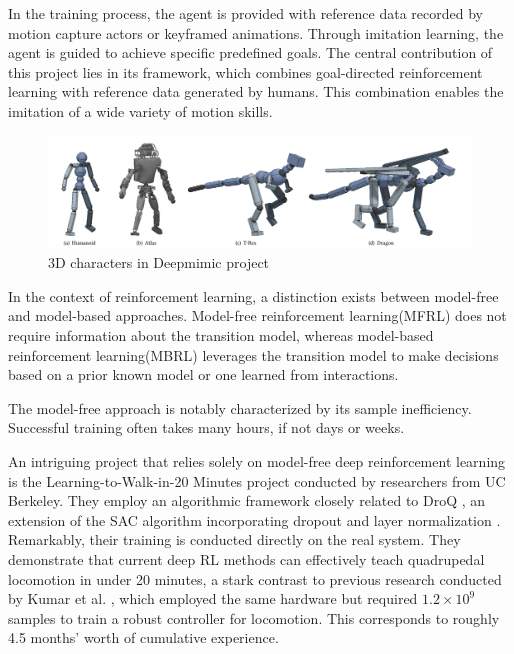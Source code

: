 In the training process, the agent is provided with reference data recorded by motion capture actors or keyframed animations. Through imitation learning, the agent is guided to achieve specific predefined goals. The central contribution of this project lies in its framework, which combines goal-directed reinforcement learning with reference data generated by humans. This combination enables the imitation of a wide variety of motion skills.

\begin{figure}[H]
  \centering
  \includegraphics[width=1.1\textwidth]{figures/deepmimic.png} %
  \caption{3D characters in Deepmimic project\cite{peng2018deepmimic}}
  \label{fig:deepmimic}
\end{figure}

In the context of reinforcement learning, a distinction exists between model-free and model-based approaches. Model-free reinforcement learning(MFRL) does not require information about the transition model, whereas model-based reinforcement learning(MBRL) leverages the transition model to make decisions based on a prior known model or one learned from interactions.

The model-free approach is notably characterized by its sample inefficiency. Successful training often takes many hours, if not days or weeks.

An intriguing project that relies solely on model-free deep reinforcement learning is the Learning-to-Walk-in-20 Minutes project\cite{smith2022walk} conducted by researchers from UC Berkeley. They employ an algorithmic framework closely related to DroQ \cite{hiraoka2021dropout}, an extension of the SAC algorithm \cite{haarnoja2018soft} incorporating dropout \cite{srivastava2014dropout} and layer normalization \cite{ba2016layer}. Remarkably, their training is conducted directly on the real system. They demonstrate that current deep RL methods can effectively teach quadrupedal locomotion in under 20 minutes, a stark contrast to previous research conducted by Kumar et al. \cite{kumar2021rma}, which employed the same hardware but required \(1.2 \times 10^9\) samples to train a robust controller for locomotion. This corresponds to roughly 4.5 months' worth of cumulative experience.

